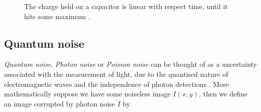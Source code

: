 \documentclass[12pt,twoside,notitlepage]{report}
\begin{document}
            \begin{figure}[H]
                \centering


                \caption{The charge held on a capacitor is linear with respect time, until it hits some maximum \cite{gamal2005cmos}.}
                \label{fig:linear_charge_wrt_photon_rate}
            \end{figure}


        \subsection{Quantum noise}
            \textit{Quantum noise}, \textit{Photon noise} or \textit{Poisson noise} can be thought of as a uncertainty 
            associated with the measurement of light, due to the quantised nature of electromagnetic waves and the 
            independence of photon detections \cite{hasinoff2014photon}. More mathematically suppose we have some 
            noiseless image $I(x,y)$, then we define an image corrupted by photon noise $\tilde{I}$ by
\end{document}
